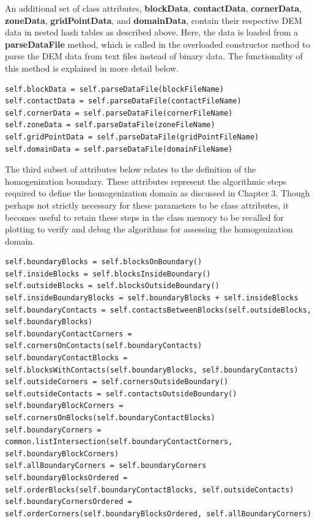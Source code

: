 An additional set of class attributes, \textbf{blockData}, \textbf{contactData}, \textbf{cornerData}, \textbf{zoneData}, \textbf{gridPointData}, and \textbf{domainData}, contain their respective DEM data in nested hash tables as described above. Here, the data is loaded from a \textbf{parseDataFile} method, which is called in the overloaded constructor method to parse the DEM data from text files instead of binary data. The functionality of this method is explained in more detail below.

\begin{lstlisting}[frame=single] 
self.blockData = self.parseDataFile(blockFileName)
self.contactData = self.parseDataFile(contactFileName)
self.cornerData = self.parseDataFile(cornerFileName)
self.zoneData = self.parseDataFile(zoneFileName)
self.gridPointData = self.parseDataFile(gridPointFileName)
self.domainData = self.parseDataFile(domainFileName)
\end{lstlisting}

The third subset of attributes below relates to the definition of the homogenization boundary. These attributes represent the algorithmic steps required to define the homogenization domain as discussed in Chapter 3. Though perhaps not strictly necessary for these parameters to be class attributes, it becomes useful to retain these steps in the class memory to be recalled for plotting to verify and debug the algorithms for assessing the homogenization domain.

\begin{lstlisting}[frame=single] 
self.boundaryBlocks = self.blocksOnBoundary()
self.insideBlocks = self.blocksInsideBoundary()
self.outsideBlocks = self.blocksOutsideBoundary()
self.insideBoundaryBlocks = self.boundaryBlocks + self.insideBlocks
self.boundaryContacts = self.contactsBetweenBlocks(self.outsideBlocks, self.boundaryBlocks)
self.boundaryContactCorners = self.cornersOnContacts(self.boundaryContacts)
self.boundaryContactBlocks = self.blocksWithContacts(self.boundaryBlocks, self.boundaryContacts)
self.outsideCorners = self.cornersOutsideBoundary()
self.outsideContacts = self.contactsOutsideBoundary()
self.boundaryBlockCorners = self.cornersOnBlocks(self.boundaryContactBlocks)
self.boundaryCorners = common.listIntersection(self.boundaryContactCorners, self.boundaryBlockCorners)
self.allBoundaryCorners = self.boundaryCorners
self.boundaryBlocksOrdered = self.orderBlocks(self.boundaryContactBlocks, self.outsideContacts)
self.boundaryCornersOrdered = self.orderCorners(self.boundaryBlocksOrdered, self.allBoundaryCorners)
\end{lstlisting}

